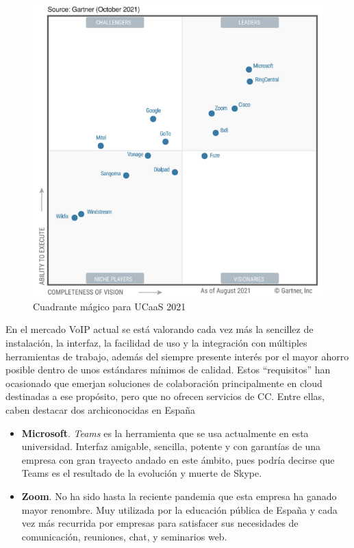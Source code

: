 \documentclass[a4paper, 12pt]{book}
\begin{document}
\begin{figure}[h]
  \centering
  \includegraphics{img/fig_gartner_2021}
  \caption{Cuadrante mágico para UCaaS 2021}
  \label{figura:fig_gartner}
\end{figure}
En el mercado VoIP actual se está valorando cada vez más la sencillez de instalación, la interfaz, la facilidad de uso y la integración con múltiples herramientas de trabajo, además del siempre presente interés por el mayor ahorro posible dentro de unos estándares mínimos de calidad. Estos ``requisitos'' han ocasionado que emerjan soluciones de colaboración principalmente en cloud destinadas a ese propósito, pero que no ofrecen servicios de CC. Entre ellas, caben destacar dos archiconocidas en España
\begin{itemize}
  \item \textbf{Microsoft}. \emph{Teams} es la herramienta que se usa actualmente en esta universidad. Interfaz amigable, sencilla, potente y con garantías de una empresa con gran trayecto andado en este ámbito, pues podría decirse que Teams es el resultado de la evolución y muerte de Skype.  

  \item \textbf{Zoom}. No ha sido hasta la reciente pandemia que esta empresa ha ganado mayor renombre. Muy utilizada por la educación pública de España y cada vez más recurrida por empresas para satisfacer sus necesidades de comunicación, reuniones, chat, y seminarios web.
\end{itemize}
  
\end{document}
